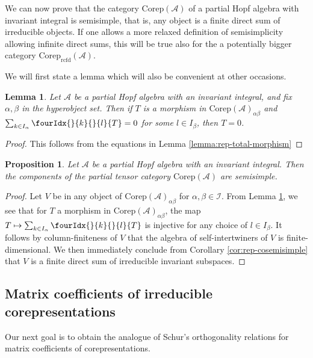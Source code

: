 \documentclass[10pt]{article}
\DeclareMathOperator{\rcf}{\mathrm{rcfd}}
\newcommand{\Corep}{\mathrm{Corep}}
\newcommand{\Gr}[5]{\fourIdx{#2}{#4}{#3}{#5}{#1}}%
\newcommand{\Gru}[3]{\Gr{#1}{}{}{#2}{#3}}
\newtheorem{Lem}[Theorem]{Lemma}
\newtheorem{Prop}[Theorem]{Proposition}
\theoremstyle{definition}
\numberwithin{equation}{section}
\begin{document}
We can now prove that the category $\Corep(\mathscr{A})$ of a partial Hopf algebra with invariant integral is semisimple, that is, any object is a finite direct sum of irreducible objects. If one allows a more relaxed definition of semisimplicity allowing infinite direct sums, this will be true also for the a potentially bigger category $\Corep_{\rcf}(\mathscr{A})$.

We will first state a lemma which will also be convenient at other occasions.

\begin{Lem}\label{LemInjMor}  Let $\mathscr{A}$ be a partial Hopf algebra with an invariant integral, and fix $\alpha,\beta$ in the hyperobject set.  Then if $T$ is a morphism in $\Corep(\mathscr{A})_{\alpha\beta}$ and $\sum_{k\in I_\alpha} \Gru{T}{k}{l}=0$ for some $l \in I_\beta$, then $T=0$.
\end{Lem} 

\begin{proof} This follows from the equations in Lemma \ref{lemma:rep-total-morphism}
\end{proof}

\begin{Prop}\label{prop:rep-cosemisimple} Let $\mathscr{A}$ be a partial Hopf algebra with an invariant integral.   Then the components of the partial tensor category $\Corep(\mathscr{A})$ are semisimple.
\end{Prop}
\begin{proof} 

Let $V$ be in any object of $\Corep(\mathscr{A})_{\alpha\beta}$ for $\alpha,\beta\in \mathscr{I}$.  From Lemma \ref{LemInjMor}, we see that for $T$ a morphism in $\Corep(\mathscr{A})_{\alpha\beta}$, the map $T\mapsto \sum_{k\in I_\alpha} \Gru{T}{k}{l}$ is injective for any choice of $l\in I_\beta$. It follows by column-finiteness of $V$ that the algebra of self-intertwiners of $V$ is finite-dimensional. We then immediately conclude from Corollary \ref{cor:rep-cosemisimple} that $V$ is a finite direct sum of irreducible invariant subspaces.
\end{proof} 

\subsection{Matrix coefficients of irreducible corepresentations}

Our next goal is to obtain the analogue of Schur's orthogonality
relations for matrix coefficients of corepresentations.
\end{document}
